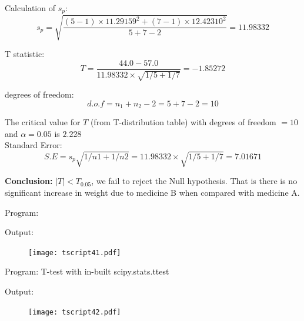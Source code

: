 \documentclass[a4paper,11pt,openright]{report}
\begin{document}
\begin{enumerate}
Calculation of $s_{p}$:
\begin{equation*}
s_{p} = \sqrt{\frac{(5-1) \times 11.29159^{2} + (7-1) \times 12.42310^{2}}{5+7-2}} 
      = 11.98332
\end{equation*}

T statistic:
\begin{equation*}
T = \frac{44.0 - 57.0}{11.98332 \times \sqrt{1/5 + 1/7}} = -1.85272
\end{equation*}

degrees of freedom:
\begin{equation*}
d.o.f = n_{1} + n_{2} -2 = 5 + 7 - 2 = 10
\end{equation*}

The critical value for $T$ (from T-distribution table) with degrees of freedom $= 10$ and
$\alpha = 0.05$ is $2.228$ \\

Standard Error:
\begin{equation*}
S.E = s_{p} \sqrt{1/n1 + 1/n2} = 11.98332 \times \sqrt{1/5 + 1/7} = 7.01671
\end{equation*}

\textbf{Conclusion:} $|T| < T_{0.05}$, we fail to reject the Null hypothesis. That is there is
no significant increase in weight due to medicine B when compared with medicine A.

\pagebreak

Program:


\vspace{1cm}

Output:


\begin{figure}[ht!]
\texttt{[image: tscript41.pdf]}
\centering
\end{figure}

\pagebreak

Program: T-test with in-built scipy.stats.ttest


\vspace{0.5cm}

Output:


\begin{figure}[ht!]
\texttt{[image: tscript42.pdf]}
\centering
\end{figure}

\vspace{1cm}


\end{enumerate}
\end{document}
